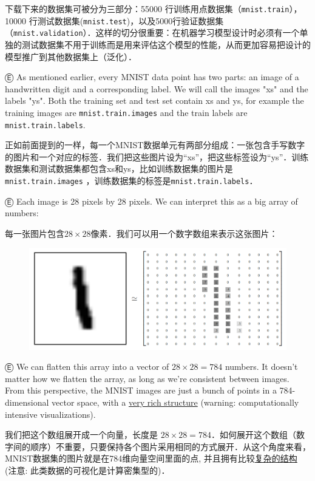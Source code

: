 下载下来的数据集可被分为三部分：55000 行训练用点数据集（\lstinline{mnist.train}），10000 行测试数据集(\lstinline{mnist.test})，以及5000行验证数据集（\lstinline{mnist.validation}）．这样的切分很重要：在机器学习模型设计时必须有一个单独的测试数据集不用于训练而是用来评估这个模型的性能，从而更加容易把设计的模型推广到其他数据集上（泛化）．

Ⓔ \textcolor{etc}{As mentioned earlier, every MNIST data point has two parts: an image of a handwritten digit and a corresponding label. We will call the images "xs" and the labels "ys". Both the training set and test set contain xs and ys, for example the training images are \lstinline{mnist.train.images} and the train labels are \lstinline{mnist.train.labels}.}

正如前面提到的一样，每一个MNIST数据单元有两部分组成：一张包含手写数字的图片和一个对应的标签．我们把这些图片设为“xs”，把这些标签设为“ys”．训练数据集和测试数据集都包含xs和ys，比如训练数据集的图片是\lstinline{mnist.train.images} ，训练数据集的标签是\lstinline{mnist.train.labels}．

Ⓔ \textcolor{etc}{Each image is 28 pixels by 28 pixels. We can interpret this as a big array of numbers:}

每一张图片包含$ 28 \times 28$像素．我们可以用一个数字数组来表示这张图片：

\begin{figure}[htbp]
\centering
\includegraphics[width=.8\textwidth]{../SOURCE/images/MNIST-Matrix.png}
\caption{}
\end{figure}

Ⓔ \textcolor{etc}{We can flatten this array into a vector of $ 28 \times 28 = 784$ numbers. It doesn't matter how we flatten the array, as long as we're consistent between images. From this perspective, the MNIST images are just a bunch of points in a 784-dimensional vector space, with a \href{http://colah.github.io/posts/2014-10-Visualizing-MNIST/}{very rich structure} (warning: computationally intensive visualizations).}

我们把这个数组展开成一个向量，长度是 $ 28 \times 28 = 784$．如何展开这个数组（数字间的顺序）不重要，只要保持各个图片采用相同的方式展开．从这个角度来看，MNIST数据集的图片就是在784维向量空间里面的点, 并且拥有比较\href{http://colah.github.io/posts/2014-10-Visualizing-MNIST/}{复杂的结构} (注意: 此类数据的可视化是计算密集型的)．

